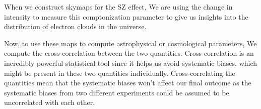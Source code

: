 When we construct skymaps for the SZ effect, We are using the change in intensity to measure this comptonization parameter to give us insights into
the distribution of electron clouds in the universe.

Now, to use these maps to compute astrophysical or cosmological parameters, We compute the cross-correlation between the two quantities. Cross-correlation
is an incredibly powerful statistical tool since it helps us avoid systematic biases, which might be present in these two quantities individually.
Cross-correlating the quantities mean that the systematic biases won't affect our final outcome as the systematic biases from two different experiments could be
assumed to be uncorrelated with each other.



